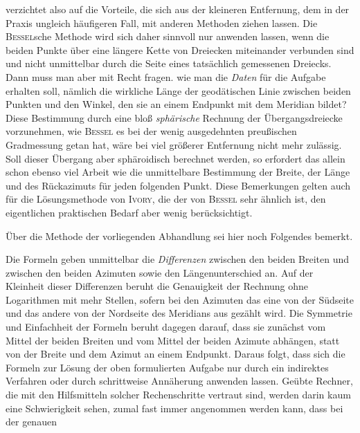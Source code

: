 %
verzichtet also auf die Vorteile, die sich aus der kleineren Entfernung, dem in der Praxis ungleich häufigeren Fall, mit anderen Methoden ziehen lassen. Die \textsc{Bessel}sche Methode wird sich daher sinnvoll nur anwenden lassen, wenn die beiden Punkte über eine längere Kette von Dreiecken miteinander verbunden sind und nicht unmittelbar durch die Seite eines tatsächlich gemessenen Dreiecks. Dann muss man aber mit Recht fragen. wie man die \textit{Daten} für die Aufgabe erhalten soll, nämlich die wirkliche Länge der geodätischen Linie zwischen beiden Punkten und den Winkel, den sie an einem Endpunkt mit dem Meridian bildet? Diese Bestimmung durch eine bloß \textit{sphärische} Rechnung der Übergangsdreiecke vorzunehmen, wie \textsc{Bessel} es bei der wenig ausgedehnten preußischen Gradmessung getan hat, wäre bei viel größerer Entfernung nicht mehr zulässig. Soll dieser Übergang aber sphäroidisch berechnet werden, so erfordert das allein schon ebenso viel Arbeit wie die unmittelbare Bestimmung der Breite, der Länge und des Rückazimuts für jeden folgenden Punkt. Diese Bemerkungen gelten auch für die Lösungsmethode von \textsc{Ivory}, die der von \textsc{Bessel} sehr ähnlich ist, den eigentlichen praktischen Bedarf aber wenig berücksichtigt.

Über die Methode der vorliegenden Abhandlung sei hier noch Folgendes bemerkt.

Die Formeln geben unmittelbar die \textit{Differenzen} zwischen den beiden Breiten und zwischen den beiden Azimuten sowie den Längenunterschied an. Auf der Kleinheit dieser Differenzen beruht die Genauigkeit der Rechnung ohne Logarithmen mit mehr Stellen, sofern bei den Azimuten das eine von der Südseite und das andere von der Nordseite des Meridians aus gezählt wird. Die Symmetrie und Einfachheit der Formeln beruht dagegen darauf, dass sie zunächst vom Mittel der beiden Breiten und vom Mittel der beiden Azimute abhängen, statt von der Breite und dem Azimut an einem Endpunkt. Daraus folgt, dass sich die Formeln zur Lösung der oben formulierten Aufgabe nur durch ein indirektes Verfahren oder durch schrittweise Annäherung anwenden lassen. Geübte Rechner, die mit den Hilfsmitteln solcher Rechenschritte vertraut sind, werden darin kaum eine Schwierigkeit sehen, zumal fast immer angenommen werden kann, dass bei der genauen %
